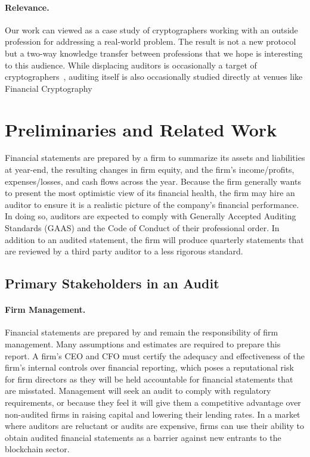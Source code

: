\paragraph{\textbf{Relevance.}} Our work can viewed as a case study of cryptographers working with an outside profession for addressing a real-world problem. The result is not a new protocol but a two-way knowledge transfer between professions that we hope is interesting to this audience. While displacing auditors is occasionally a target of cryptographers~\cite{narula2018zkledger,dagher2015provisions}, auditing itself is also occasionally studied directly at venues like Financial Cryptography



\section{Preliminaries and Related Work}
Financial statements are prepared by a firm to summarize its assets and liabilities at year-end, the resulting changes in firm equity, and the firm’s income/profits, expenses/losses, and cash flows across the year. Because the firm generally wants to present the most optimistic view of its financial health, the firm may hire an auditor to ensure it is a realistic picture of the company's financial performance. In doing so, auditors are expected to comply with Generally Accepted Auditing Standards (GAAS) and the Code of Conduct of their professional order. In addition to an audited statement, the firm will produce quarterly statements that are reviewed by a third party auditor to a less rigorous standard.


\subsection{Primary Stakeholders in an Audit}

\paragraph{Firm Management.} Financial statements are prepared by and remain the responsibility of firm management. Many assumptions and estimates are required to prepare this report. A firm's CEO and CFO must certify the adequacy and effectiveness of the firm's internal controls over financial reporting, which poses a reputational risk for firm directors as they will be held accountable for financial statements that are misstated. Management will seek an audit to comply with regulatory requirements, or because they feel it will give them a competitive advantage over non-audited firms in raising capital and lowering their lending rates. In a market where auditors are reluctant or audits are expensive, firms can use their ability to obtain audited financial statements as a barrier against new entrants to the blockchain sector. 

